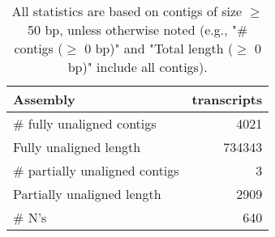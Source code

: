 \documentclass[12pt,a4paper]{article}
\begin{document}
\begin{table}[ht]
\begin{center}
\caption{All statistics are based on contigs of size $\geq$ 50 bp, unless otherwise noted (e.g., "\# contigs ($\geq$ 0 bp)" and "Total length ($\geq$ 0 bp)" include all contigs).}
\begin{tabular}{|l*{1}{|r}|}
\hline
Assembly & transcripts \\ \hline
\# fully unaligned contigs & 4021 \\ \hline
Fully unaligned length & 734343 \\ \hline
\# partially unaligned contigs & 3 \\ \hline
Partially unaligned length & 2909 \\ \hline
\# N's & 640 \\ \hline
\end{tabular}
\end{center}
\end{table}
\end{document}
